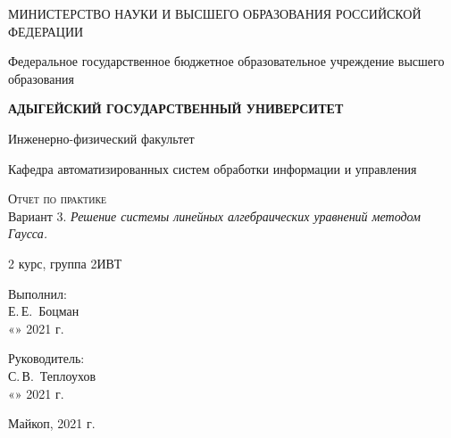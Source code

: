 \documentclass[12pt,a4paper]{scrartcl}
\begin{document}
	\begin{titlepage}
		\begin{center}
			\large
			МИНИСТЕРСТВО НАУКИ И ВЫСШЕГО ОБРАЗОВАНИЯ РОССИЙСКОЙ ФЕДЕРАЦИИ
			
			Федеральное государственное бюджетное образовательное учреждение высшего образования
			
			\textbf{АДЫГЕЙСКИЙ ГОСУДАРСТВЕННЫЙ УНИВЕРСИТЕТ}
			\vspace{0.25cm}
			
			Инженерно-физический факультет
			
			Кафедра автоматизированных систем обработки информации и управления
			\vfill

			\vfill
			
			\textsc{Отчет по практике}\\[5mm]
			
			{\LARGE Вариант 3. \textit{Решение системы линейных алгебраических уравнений методом Гаусса.}}
			\bigskip
			
			2 курс, группа 2ИВТ
		\end{center}
		\vfill
		
		\newlength{\ML}
		\hfill\begin{minipage}{0.5\textwidth}
			Выполнил:\\
			\underline{\hspace{\ML}} Е.\,Е.~Боцман\\
			«\underline{\hspace{0.7cm}}» \underline{\hspace{2cm}} 2021 г.
		\end{minipage}%
		\bigskip
		
		\hfill\begin{minipage}{0.5\textwidth}
			Руководитель:\\
			\underline{\hspace{\ML}} С.\,В.~Теплоухов\\
			«\underline{\hspace{0.7cm}}» \underline{\hspace{2cm}} 2021 г.
		\end{minipage}%
		\vfill
		
		\begin{center}
			Майкоп, 2021 г.
		\end{center}
	\end{titlepage}
\end{document}
